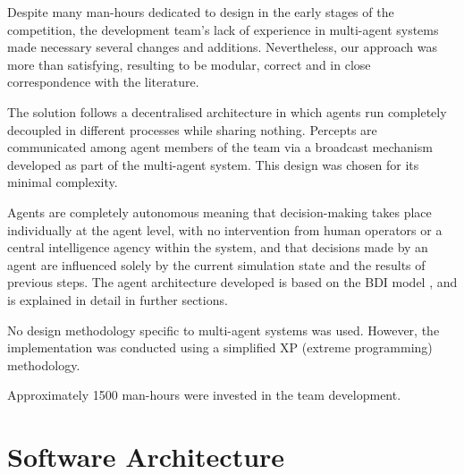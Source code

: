 \documentclass{llncs2e/llncs}
\begin{document}
    Despite many man-hours dedicated to design in the early stages of
    the competition, the development team's lack of experience in multi-agent
    systems made necessary several changes and additions. 
    Nevertheless, our approach was more than satisfying, resulting to be
    modular, correct and in close correspondence with the literature.

    The solution follows a decentralised architecture in which agents run 
    completely decoupled in different processes while sharing nothing. Percepts 
    are communicated among agent members of the team via a broadcast mechanism 
    developed as part of the multi-agent system. This design was chosen for its 
    minimal complexity.

    Agents are completely autonomous meaning that decision-making takes place 
    individually at the agent level, with no intervention from human operators or 
    a central intelligence agency within the system, and that decisions made by an 
    agent are influenced solely by the current simulation state and the results of 
    previous steps.
    The agent architecture developed is based on the BDI model \cite{Rao:1991}, 
    and is explained in detail in further sections.

    No design methodology specific to multi-agent systems was used. However, 
    the implementation was conducted using a simplified XP (extreme programming) 
    methodology.

    Approximately 1500 man-hours were invested in the team development.

\section{Software Architecture}

\end{document}

